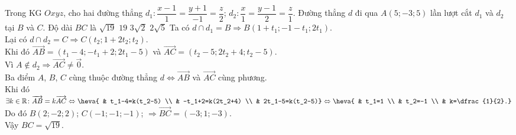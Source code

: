 \begin{ex}%
	Trong KG $Oxyz$, cho hai đường thẳng $d_1\colon \dfrac{x-1}{1}=\dfrac{y+1}{-1}=\dfrac{z}{2}$; $d_2\colon \dfrac{x}{1}=\dfrac{y-1}{2}=\dfrac{z}{1}$. Đường thẳng $d$ đi qua $A(5;-3;5)$ lần lượt cắt $d_1$ và $d_2$ tại $B$ và $C$. Độ dài $BC$ là
	\choice
	{\True $\sqrt{19}$}
	{$19$}
	{$3\sqrt{2}$}
	{$2\sqrt{5}$}
	\loigiai
	{
		Ta có $d\cap d_1=B \Rightarrow B(1+t_1;-1-t_1;2t_1)$.\\
		Lại có $d\cap d_2=C \Rightarrow C(t_2;1+2t_2;t_2)$.\\
		Khi đó $\overrightarrow{AB}=(t_1-4;-t_1+2;2t_1-5)$ và $\overrightarrow{AC}=(t_2-5;2t_2+4;t_2-5)$.\\
		Vì $A\notin d_2 \Rightarrow \overrightarrow{AC}\ne\overrightarrow{0}$.\\
		Ba điểm $A$, $B$, $C$ cùng thuộc đường thẳng $d \Leftrightarrow \overrightarrow{AB}$ và $\overrightarrow{AC}$ cùng phương.\\
		Khi đó $\exists k \in \mathbb{R} \colon \overrightarrow{AB}=k\overrightarrow{AC} \Leftrightarrow \heva{ & t_1-4=k(t_2-5) \\ & -t_1+2=k(2t_2+4) \\ & 2t_1-5=k(t_2-5)} \Leftrightarrow \heva{ & t_1=1 \\ & t_2=-1 \\ & k=\dfrac{1}{2}.}$\\
		Do đó $B(2;-2;2)$; $C(-1;-1;-1)$; $\Rightarrow \overrightarrow{BC}=(-3;1;-3)$.\\
		Vậy $BC=\sqrt{19}$.
	}
\end{ex}
